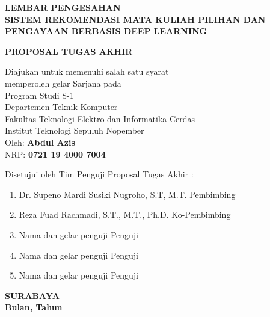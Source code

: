 \begin{center}
    \uppercase{\textbf{\large Lembar Pengesahan}} \\

    \vspace*{15mm}
    \uppercase{\textbf{Sistem rekomendasi Mata Kuliah Pilihan dan Pengayaan berbasis Deep Learning}}
    \vspace*{15mm}

    \uppercase{\textbf{Proposal Tugas Akhir}}

    \vspace*{3mm}
    Diajukan untuk memenuhi salah satu syarat          \\
    \vspace*{3mm}
    memperoleh gelar Sarjana pada                      \\
    \vspace*{3mm}
    Program Studi S-1                                  \\
    \vspace*{3mm}
    Departemen Teknik Komputer                         \\
    \vspace*{3mm}
    Fakultas Teknologi Elektro dan Informatika Cerdas  \\
    \vspace*{3mm}
    Institut Teknologi Sepuluh Nopember                \\

    \vspace*{1.5cm}
    Oleh: \textbf{Abdul Azis}                          \\
    \vspace*{3mm}
    NRP: \textbf{0721 19 4000 7004}                    \\
    \vspace*{1.5cm}

    Disetujui oleh Tim Penguji Proposal Tugas Akhir :  \\
    \vspace*{5mm}

    \begin{enumerate}
        \setlength\itemsep{1.5em}
        \item Dr. Supeno Mardi Susiki Nugroho, S.T, M.T. \hfill Pembimbing
        \item Reza Fuad Rachmadi, S.T., M.T., Ph.D. \hfill Ko-Pembimbing
        \item Nama dan gelar penguji \hfill Penguji
        \item Nama dan gelar penguji \hfill Penguji
        \item Nama dan gelar penguji \hfill Penguji
    \end{enumerate}

    \vspace*{1.5cm}
    \uppercase{\textbf{surabaya}}                      \\
    \textbf{Bulan, Tahun}                              \\

\end{center}